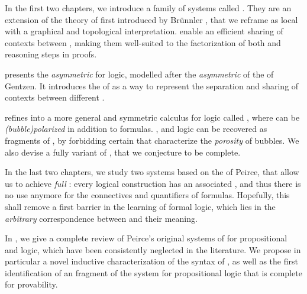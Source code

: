 \begin{description}
   In the first two chapters, we introduce a family of
  systems called . They are an extension of the theory of
   first introduced by Brünnler
  , that we reframe as local 
  with a graphical and topological interpretation.  enable an
  efficient sharing of contexts between , making them well-suited
  to the factorization of both  and  reasoning steps in
  proofs.

  \AP {} presents the \emph{asymmetric} 
   for  logic, modelled after the \emph{asymmetric}
   of the    of
  Gentzen. It introduces the  of  as a way to
   represent the separation and sharing of contexts between
  different .

  \AP {} refines  into a more general and symmetric
  calculus for  logic called , where 
  can be \emph{\kl(bubble){polarized}} in addition to formulas.
  ,  and  logic
  can be recovered as fragments of , by forbidding certain
   that characterize the \emph{porosity} of bubbles. We also
  devise a fully  variant of , that we conjecture to
  be complete.
  
  \item[Existential graphs] In the last two chapters, we study two systems based
  on the  of Peirce, that allow us to achieve \emph{full
  }: every logical construction has an associated , and thus there
  is no use anymore for the connectives and quantifiers of  formulas.
  Hopefully, this shall remove a first barrier in the learning of formal logic,
  which lies in the \emph{arbitrary} correspondence between  and their
  meaning.

  In , we give a complete review of Peirce's original systems of
   for propositional and   logic, which
  have been consistently neglected in the 
  literature.
  We propose in particular a novel inductive characterization of the syntax of
  , as well as the first identification of an \emph{}
  fragment of the system for propositional logic that is complete for
  provability.


\end{description}
